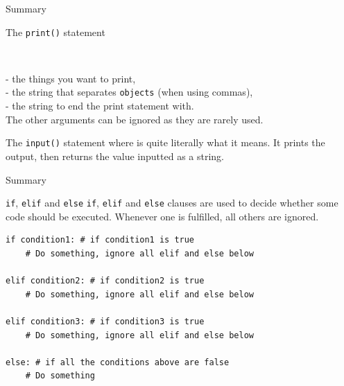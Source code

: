 \documentclass[dvipsnames, svgnames, x11names, handout]{beamer}
\begin{document}
\begin{frame}[fragile]{Summary}
\begin{block}{The \texttt{print()} statement}

\

 - the things you want to print,\\
 - the string that separates \texttt{objects} (when using commas),\\
 - the string to end the print statement with.\\
The other arguments can be ignored as they are rarely used.
\end{block}

\begin{block}{The \texttt{input()} statement}
where  is quite literally what it means. It prints the output, then returns the value inputted as a string.
\end{block}
\end{frame}

\begin{frame}[fragile]{Summary}
\begin{block}{\texttt{if}, \texttt{elif} and \texttt{else}}
\texttt{if}, \texttt{elif} and \texttt{else} clauses are used to decide whether some code should be executed.
Whenever one is fulfilled, all others are ignored.
\begin{verbatim}
if condition1: # if condition1 is true
	# Do something, ignore all elif and else below

elif condition2: # if condition2 is true
	# Do something, ignore all elif and else below

elif condition3: # if condition3 is true
	# Do something, ignore all elif and else below

else: # if all the conditions above are false
	# Do something
\end{verbatim}
\end{block}
\end{frame}
\end{document}
